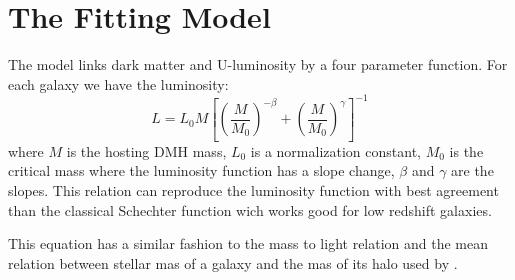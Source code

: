 \section{The Fitting Model}
The model links dark matter and U-luminosity by a four parameter function.
For each galaxy we have the luminosity:
  \begin{equation}
  L = L_{0} M \left[ \left( \frac{M}{M_0}\right)^{-\beta} 
		   + \left( \frac{M}{M_0}\right)^{\gamma} 
               \right]^{-1}
  \end{equation}
where $M$ is the hosting DMH mass, $L_{0}$ is a normalization constant, $M_0$
is the critical mass where the luminosity function has a slope change, 
$\beta$ and $\gamma$ are the slopes.
This relation can reproduce the luminosity function with best agreement than the classical Schechter function wich works good for low redshift galaxies.

This equation has a similar fashion to the mass to light relation \citep{vandenbosch03} and the mean relation between stellar mas of a galaxy and the mas of its halo used by \cite{moster10}.
